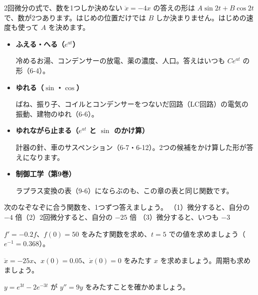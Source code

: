 \begin{tsumazuki}{2回微分の式で、数を1つしか決めない}
$\ddot{x}=-4x$ の答えの形は $A\sin2t+B\cos2t$ で、数が2つあります。はじめの位置だけでは $B$ しか決まりません。はじめの速度も使って $A$ を決めます。
\end{tsumazuki}

\begin{butsuri}
\begin{itemize}[leftmargin=1.2\zw, itemsep=1pt, topsep=0pt, label={\color{bkPurple}●}]
\item \textbf{ふえる・へる（$e^{at}$）}\par\noindent 冷めるお湯、コンデンサーの放電、薬の濃度、人口。答えはいつも $Ce^{at}$ の形（6-4）。
\item \textbf{ゆれる（$\sin$・$\cos$）}\par\noindent ばね、振り子、コイルとコンデンサーをつないだ回路（LC回路）の電気の振動、建物のゆれ（6-6）。
\item \textbf{ゆれながら止まる（$e^{at}$ と $\sin$ のかけ算）}\par\noindent 計器の針、車のサスペンション（6-7・6-12）。2つの候補をかけ算した形が答えになります。
\item \textbf{制御工学（第9巻）}\par\noindent ラプラス変換の表（9-6）にならぶのも、この章の表と同じ関数です。
\end{itemize}
\end{butsuri}

\bkendproblems
{}

\bkproblem 次のなぞなぞに合う関数を、1つずつ答えましょう。\newline
（1）微分すると、自分の $-4$ 倍\quad（2）2回微分すると、自分の $-25$ 倍\newline
（3）微分すると、いつも $-3$

\bkproblem $f'=-0.2f$、$f(0)=50$ をみたす関数を求め、$t=5$ での値を求めましょう（$e^{-1}=0.368$）。

\bkproblem $\ddot{x}=-25x$、$x(0)=0.05$、$\dot{x}(0)=0$ をみたす $x$ を求めましょう。周期も求めましょう。

\bkproblem $y=e^{3t}-2e^{-3t}$ が $y''=9y$ をみたすことを確かめましょう。

